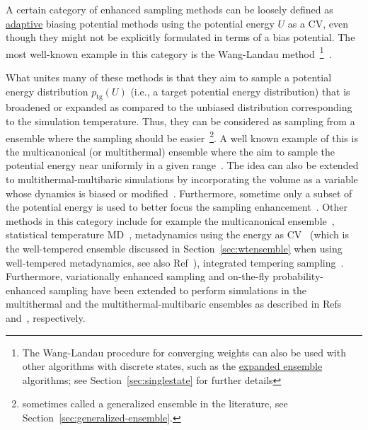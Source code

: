 \documentclass[9pt,review]{livecoms}
\begin{document}
A certain category of enhanced sampling methods can be loosely defined as \hyperlink{ref:Adaptive} {adaptive} biasing potential methods using the potential energy $U$ as a CV, even though they might not be explicitly formulated in terms of a bias potential. The most well-known example in this category is the Wang-Landau method~\footnote{The Wang-Landau procedure for converging weights can also be used with other algorithms with discrete states, such as the \hyperlink{ref:ExpEns} {expanded ensemble} algorithms; see Section~\ref{sec:singlestate} for further details}~\cite{wang-landau:prl:2001:wang-landau}.

What unites many of these methods is that they aim to sample a potential energy distribution $p_{\mathrm{tg}}(U)$ (i.e., a target potential energy distribution) that is broadened or expanded as compared to the unbiased distribution corresponding to the simulation temperature. Thus, they can be considered as sampling from a ensemble where the sampling should be easier~\footnote{sometimes called a generalized ensemble in the literature, see Section~\ref{sec:generalized-ensemble}.}. A well known example of this is the multicanonical (or multithermal) ensemble where the aim to sample the potential energy near uniformly in a given range~\cite{Berg1992_Multicanonical}. The idea can also be extended to multithermal-multibaric simulations by incorporating the volume as a variable whose dynamics is biased or modified~\cite{Okumura_MultiTP_2004,Shell_MultiTP_2002}. Furthermore, sometime only a subset of the potential energy is used to better focus the sampling enhancement~\cite{Yang_SITS_2009}. Other methods in this category include for example
the multicanonical ensemble~\cite{Berg1992_Multicanonical},
statistical temperature MD~\cite{Kim2006_PRL_STMD},
metadynamics using the energy as CV~\cite{Micheletti_MetaE_Energy_2004,Bonomi-PRL-2010}
(which is the well-tempered ensemble discussed in Section~\ref{sec:wtensemble} when using well-tempered metadynamics, see also Ref~\cite{Valsson-JCTC-2013}),
integrated tempering sampling~\cite{Gao_ITS_2008,Gao_ITS_Review_2015}.
Furthermore, variationally enhanced sampling and on-the-fly probability-enhanced sampling have been extended to perform simulations in the multithermal and the multithermal-multibaric ensembles as described in Refs~\citep{Piaggi_MultiVES_2019,Piaggi_MultiVES+CV_2019} and~\citep{invernizzi2020unified}, respectively.
\end{document}
